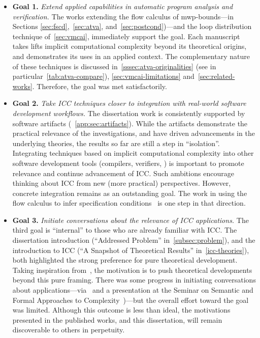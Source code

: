 \begin{itemize}

\item[\iconDONE{ }]\textbf{Goal 1.}
\emph{Extend applied capabilities in automatic program analysis and
verification.} The works extending the flow calculus of mwp-bounds---in Sections
\autoref{sec:fscd},~\autoref{sec:atva}, and~\autoref{sec:postcond})---and the
loop distribution technique of~\autoref{sec:vmcai}, immediately support the
goal. Each manuscript takes lifts implicit computational complexity beyond its
theoretical origins, and demonstrates its uses in an applied context. The
complementary nature of these techniques is discussed
in~\autoref{sssec:atva-originalities} (see in
particular~\autoref{tab:atva-compare}), \autoref{sec:vmcai-limitations}
and~\autoref{sec:related-works}. Therefore, the goal was met satisfactorily.

\item[\iconPROG]\textbf{Goal 2.}
\emph{Take ICC techniques closer to integration with real-world software
development workflows.} The dissertation work is consistently supported by
software artifacts (\cf~\autoref{app:sec:artifacts}). While the artifacts
demonstrate the practical relevance of the investigations, and have driven
advancements in the underlying theories, the results so far are still a step in
\enquote{isolation}. Integrating techniques based on implicit computational
complexity into other software development tools (compilers, verifiers, \etc) is
important to promote relevance and continue advancement of ICC\@. Such ambitions
encourage thinking about ICC from new (more practical) perspectives. However,
concrete integration remains as an outstanding goal. The work in using the flow
calculus to infer specification
conditions~\cite{rusch2025} is one step in that direction.

\item[\iconPROG]\textbf{Goal 3.}
\emph{Initiate conversations about the relevance of ICC applications.} The third
goal is \enquote{internal} to those who are already familiar with ICC. The
dissertation introduction (\ie \enquote{Addressed Problem}
in~\autoref{subsec:problem}), and the introduction to ICC (\enquote{A Snapshot
of Theoretical Results} in~\autoref{icc-theories}), both highlighted the strong
preference for pure theoretical development. Taking inspiration
from~\cite{moyen2017}, the motivation is to push theoretical developments beyond
this pure framing. There was some progress in initiating conversations about
applications---via~\cite{aubert20222} and a presentation at the Seminar on
Semantic and Formal Approaches to Complexity~\cite{scot23})---but the overall
effort toward the goal was limited. Although this outcome is less than ideal,
the motivations presented in the published works, and this dissertation, will
remain discoverable to others in perpetuity.


\end{itemize}
